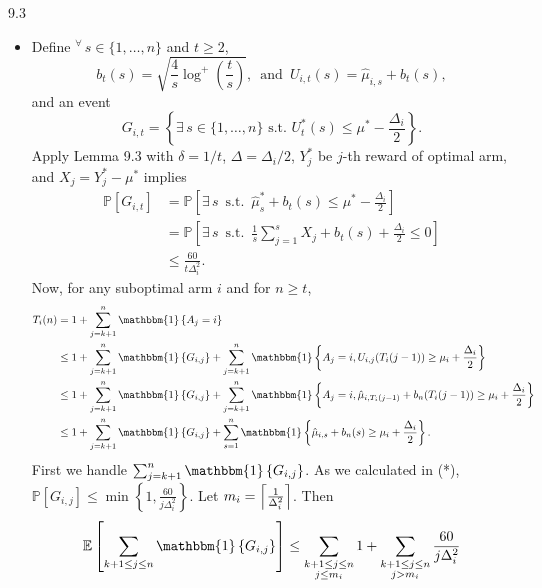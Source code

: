 \documentclass[10pt]{article}
\theoremstyle{definition}
\newenvironment{solution*}[1]{%
  \IfBlankTF{#1}
    {\renewcommand{\themanualsolutioninner}{\unskip}}
    {\renewcommand\themanualsolutioninner{#1}}%
  \manualsolutioninner
}{\endmanualsolutioninner}
\DeclarePairedDelimiter{\ceil}{\lceil}{\rceil}
\begin{document}
\begin{solution*}{9.3}
\begin{itemize}
        \item[(c)] Define $^\forall \, s \in \{1,\ldots,n\}$ and $t \geq 2$,
        \begin{equation*}
            b_t(s) = \sqrt{\frac{4}{s} \log^+ \left(\frac{t}{s}\right)}, \, \text{ and } \, U_{i,t}(s) = \hat{\mu}_{i,s} + b_t(s),
        \end{equation*}
        and an event
        \begin{equation*}
            G_{i,t} = \left\{ \exists \, s \in \{1, \ldots, n\} \text{ s.t. } U^*_t (s) \leq \mu^* - \frac{\Delta_i}{2} \right\}.
        \end{equation*}
        Apply Lemma 9.3 with $\delta = 1/t$, $\Delta = \Delta_i /2$, $Y_j^*$ be $j$-th reward of optimal arm, and $X_j = Y_j^* - \mu^*$ implies
        \begin{align*}
            \mathbb{P}\left[G_{i,t}\right]
            &= \mathbb{P}\left[ \exists \, s \, \text{ s.t. } \, \hat{\mu}_s^* + b_t(s) \leq \mu^* - \frac{\Delta_i}{2} \right] \\
            &= \mathbb{P}\left[ \exists \, s \, \text{ s.t. } \, \frac{1}{s} \sum_{j=1}^s X_j + b_t(s) + \frac{\Delta_i}{2} \leq 0 \right]\\
            &\leq \frac{60}{t \Delta_i^2}.\tag{*}
        \end{align*}
        Now, for any suboptimal arm $i$ and for $n \geq t$,
        \begin{align*}
            T_i (n) &= 1 + \sum_{j=k+1}^n \mathbbm{1}\left\{A_j = i\right\} \\
            &\leq 1 + \sum_{j=k+1}^n \mathbbm{1}\left\{G_{i,j}\right\} + \sum_{j=k+1}^n \mathbbm{1}\left\{A_j=i, U_{i,j}(T_i(j-1)) \geq \mu_i + \frac{\Delta_i}{2}\right\} \\
            &\leq 1 + \sum_{j=k+1}^n \mathbbm{1}\left\{G_{i,j}\right\} + \sum_{j=k+1}^n \mathbbm{1}\left\{A_j=i, \hat{\mu}_{i,T_i(j-1)}+b_n(T_i(j-1)) \geq \mu_i + \frac{\Delta_i}{2}\right\} \\
            &\leq 1 + \sum_{j=k+1}^n \mathbbm{1}\left\{G_{i,j}\right\} + \sum_{s=1}^n \mathbbm{1}\left\{\hat{\mu}_{i,s}+b_n(s) \geq \mu_i + \frac{\Delta_i}{2}\right\}.
        \end{align*}
        First we handle $\sum_{j=k+1}^n \mathbbm{1}\left\{G_{i,j}\right\}$. As we calculated in (*), $\mathbb{P}[G_{i,j}] \leq \min\left\{1,\frac{60}{j\Delta_i^2}\right\}$.
        Let $m_i = \ceil*{\frac{1}{\Delta_i^2}}$. Then
        \begin{align*}
            \mathbb{E}\left[\sum_{k+1 \leq j \leq n} \mathbbm{1}\left\{G_{i,j}\right\}\right] &\leq \sum_{\substack{k+1 \leq j \leq n \\ j \leq m_i}} 1 + \sum_{\substack{k+1 \leq j \leq n \\ j > m_i}} \frac{60}{j\Delta_i^2} \\

\end{align*}
\end{itemize}
\end{solution*}
\end{document}
